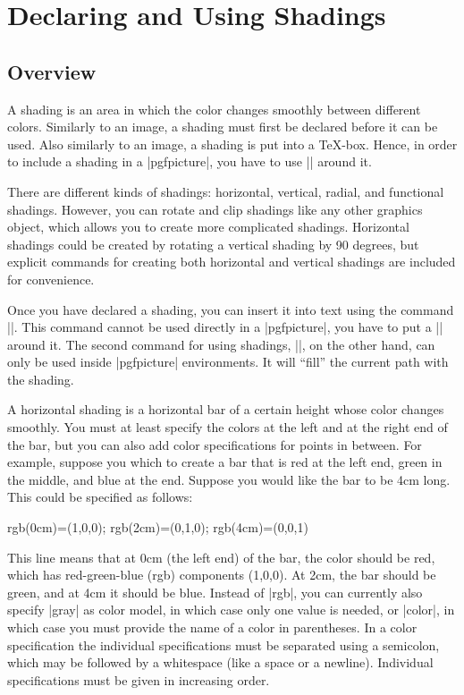 %
%
%


\section{Declaring and Using Shadings}

\label{section-shadings}

\subsection{Overview}

A shading is an area in which the color changes smoothly between different
colors. Similarly to an image, a shading must first be declared before
it can be used. Also similarly to an image, a shading is put into a
\TeX-box. Hence, in order to include a shading in a |{pgfpicture}|,
you have to use |\pgftext| around it.

There are different kinds of shadings: horizontal, vertical, radial,
and functional shadings. However, you can rotate and clip shadings
like any other graphics object, which allows you to create more
complicated shadings. Horizontal shadings could be created by rotating
a vertical shading by 90 degrees, but explicit commands for creating both
horizontal and vertical shadings are included for convenience.

Once you have declared a shading, you can insert it into text using
the command |\pgfuseshading|. This command cannot be used directly in
a |{pgfpicture}|, you have to put a |\pgftext| around it. The second
command for using shadings, |\pgfshadepath|, on the other hand, can
only be used  inside |{pgfpicture}| environments. It will ``fill'' the
current path with the shading.

A horizontal shading is a horizontal bar of a certain height whose
color changes smoothly. You must at least specify the colors at the
left and at the right end of the bar, but you can also add color
specifications for points in between. For example, suppose you
which to create a bar that is red at the left end, green in the
middle, and blue at the end. Suppose you would like the bar to be 4cm
long. This could be specified as follows:
\begin{codeexample}
rgb(0cm)=(1,0,0); rgb(2cm)=(0,1,0); rgb(4cm)=(0,0,1)
\end{codeexample}
This line means that at 0cm (the left end) of the bar, the color
should be red, which has red-green-blue (rgb) components (1,0,0). At
2cm, the bar should be green, and at 4cm it should be blue.
Instead of |rgb|, you can currently also specify |gray| as
color model, in which case only one value is needed, or |color|,
in which case you must provide the name of a color in parentheses. In
a color specification the individual specifications must 
be separated using a semicolon, which may be followed by a whitespace
(like a space or a newline). Individual specifications must be given
in increasing order. 


